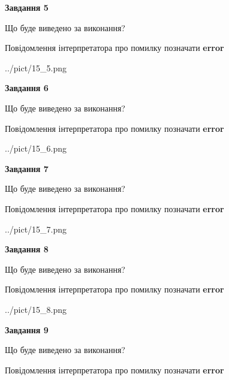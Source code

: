 \documentclass[11pt, ukrainian]{article}
\begin{document}
{\begin {large}
{\begin {center}\textbf{Завдання 5}\end {center}}\par
Що буде виведено за виконання? \par
Повідомлення інтерпретатора про помилку позначати \textbf{error}

\begin{center}
	{../pict/15_5.png}
\end{center}
\newpage

{\begin {center}\textbf{Завдання 6}\end {center}}\par
Що буде виведено за виконання? \par
Повідомлення інтерпретатора про помилку позначати \textbf{error}

\begin{center}
	{../pict/15_6.png}
\end{center}
\newpage

{\begin {center}\textbf{Завдання 7}\end {center}}\par
Що буде виведено за виконання? \par
Повідомлення інтерпретатора про помилку позначати \textbf{error}

\begin{center}
	{../pict/15_7.png}
\end{center}
\newpage

{\begin {center}\textbf{Завдання 8}\end {center}}\par
Що буде виведено за виконання? \par
Повідомлення інтерпретатора про помилку позначати \textbf{error}

\begin{center}
	{../pict/15_8.png}
\end{center}
\newpage

{\begin {center}\textbf{Завдання 9}\end {center}}\par
Що буде виведено за виконання? \par
Повідомлення інтерпретатора про помилку позначати \textbf{error}


\end{large}}
\end{document}
